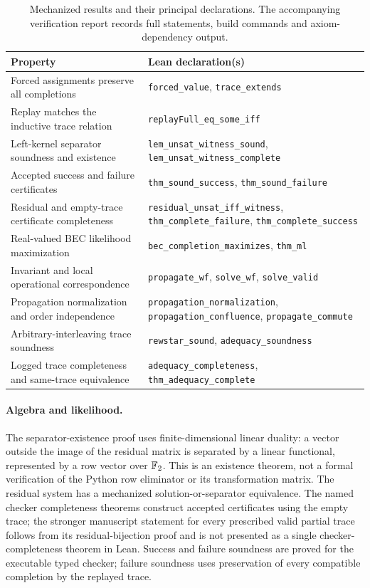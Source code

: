 \begin{table}[t]
\centering\small
\caption{Mechanized results and their principal declarations.
The accompanying verification report records full statements,
build commands and axiom-dependency output.}
\label{tab:lean}
\begin{tabular}{>{\raggedright\arraybackslash}p{}>{\raggedright\arraybackslash}p{}}
\toprule
Property & Lean declaration(s) \\
\midrule
Forced assignments preserve all completions &
\texttt{forced\_value}, \texttt{trace\_extends} \\
Replay matches the inductive trace relation &
\texttt{replayFull\_eq\_some\_iff} \\
Left-kernel separator soundness and existence &
\texttt{lem\_unsat\_witness\_sound},
\texttt{lem\_unsat\_witness\_complete} \\
Accepted success and failure certificates &
\texttt{thm\_sound\_success}, \texttt{thm\_sound\_failure} \\
Residual and empty-trace certificate completeness &
\texttt{residual\_unsat\_iff\_witness},
\texttt{thm\_complete\_failure}, \texttt{thm\_complete\_success} \\
Real-valued BEC likelihood maximization &
\texttt{bec\_completion\_maximizes}, \texttt{thm\_ml} \\
Invariant and local operational correspondence &
\texttt{propagate\_wf}, \texttt{solve\_wf}, \texttt{solve\_valid} \\
Propagation normalization and order independence &
\texttt{propagation\_normalization},
\texttt{propagation\_confluence}, \texttt{propagate\_commute} \\
Arbitrary-interleaving trace soundness &
\texttt{rewstar\_sound}, \texttt{adequacy\_soundness} \\
Logged trace completeness and same-trace equivalence &
\texttt{adequacy\_completeness}, \texttt{thm\_adequacy\_complete} \\
\bottomrule
\end{tabular}
\end{table}

\paragraph{Algebra and likelihood.}
The separator-existence proof uses finite-dimensional linear duality:
a vector outside the image of the residual matrix is separated by a
linear functional, represented by a row vector over $\mathbb{F}_2$. This is
an existence theorem, not a formal verification of the Python row
eliminator or its transformation matrix. The residual system has a
mechanized solution-or-separator equivalence. The named checker
completeness theorems construct accepted certificates using the empty
trace; the stronger manuscript statement for every prescribed valid
partial trace follows from its residual-bijection proof and is not
presented as a single checker-completeness theorem in Lean.
Success and failure soundness
are proved for the executable typed checker; failure soundness uses
preservation of every compatible completion by the replayed trace.

